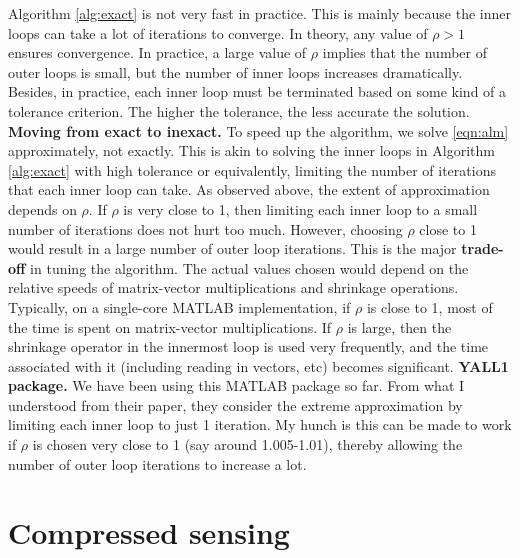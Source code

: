 \documentclass{article}
\begin{document}
\smallbreak
Algorithm \ref{alg:exact} is not very fast in practice. This is mainly because the inner loops can take a lot of iterations to converge. In theory, any value of $\rho > 1$ ensures convergence. In practice, a large value of $\rho$ implies that the number of outer loops is small, but the number of inner loops increases dramatically. Besides, in practice, each inner loop must be terminated based on some kind of a tolerance criterion. The higher the tolerance, the less accurate the solution.
\smallbreak
{\bf Moving from exact to inexact.} To speed up the algorithm, we solve \eqref{eqn:alm} approximately, not exactly. This is akin to solving the inner loops in Algorithm \ref{alg:exact} with high tolerance or equivalently, limiting the number of iterations that each inner loop can take. As observed above, the extent of approximation depends on $\rho$. If $\rho$ is very close to 1, then limiting each inner loop to a small number of iterations does not hurt too much. However, choosing $\rho$ close to 1 would result in a large number of outer loop iterations. This is the major {\bf trade-off} in tuning the algorithm. The actual values chosen would depend on the relative speeds of matrix-vector multiplications and shrinkage operations. 
\smallbreak
Typically, on a single-core MATLAB implementation, if $\rho$ is close to 1, most of the time is spent on matrix-vector multiplications. If $\rho$ is large, then the shrinkage operator in the innermost loop is used very frequently, and the time associated with it (including reading in vectors, etc) becomes significant. 
\smallbreak
{\bf YALL1 package.} We have been using this MATLAB package so far. From what I understood from their paper, they consider the extreme approximation by limiting each inner loop to just 1 iteration. My hunch is this can be made to work if $\rho$ is chosen very close to 1 (say around 1.005-1.01), thereby allowing the number of outer loop iterations to increase a lot. 

\section{Compressed sensing}
\end{document}
